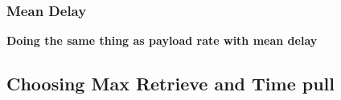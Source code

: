 \documentclass[a4paper,11pt,oneside]{report}
\begin{document}
\subsubsection{Mean Delay}
\textbf{Doing the same thing as payload rate with mean delay}



\subsection{Choosing Max Retrieve and Time pull}
\end{document}
